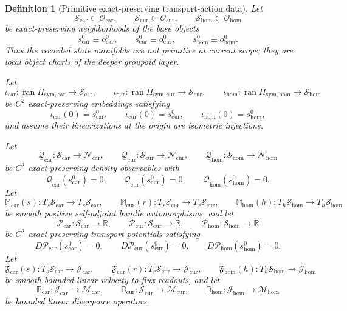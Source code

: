 \documentclass[11pt]{article}
\newcommand{\TensorSymProj}{\Pi_{\mathrm{sym,car}}}
\newcommand{\CurSymProj}{\Pi_{\mathrm{sym,cur}}}
\newcommand{\HomSymProj}{\Pi_{\mathrm{sym,hom}}}
\newcommand{\TensorDensityClass}{\mathscr N_{\mathrm{car}}}
\newcommand{\CurDensityClass}{\mathscr N_{\mathrm{cur}}}
\newcommand{\HomDensityClass}{\mathscr N_{\mathrm{hom}}}
\newcommand{\TensorStateManifold}{\mathcal S_{\mathrm{car}}}
\newcommand{\CurStateManifold}{\mathcal S_{\mathrm{cur}}}
\newcommand{\HomStateManifold}{\mathcal S_{\mathrm{hom}}}
\newcommand{\TensorStateBase}{s_{\mathrm{car}}^{0}}
\newcommand{\CurStateBase}{s_{\mathrm{cur}}^{0}}
\newcommand{\HomStateBase}{s_{\mathrm{hom}}^{0}}
\newcommand{\TensorStateEmbed}{\iota_{\mathrm{car}}}
\newcommand{\CurStateEmbed}{\iota_{\mathrm{cur}}}
\newcommand{\HomStateEmbed}{\iota_{\mathrm{hom}}}
\newcommand{\TensorFluxClass}{\mathscr J_{\mathrm{car}}}
\newcommand{\CurFluxClass}{\mathscr J_{\mathrm{cur}}}
\newcommand{\HomFluxClass}{\mathscr J_{\mathrm{hom}}}
\newcommand{\TensorDiv}{\mathbb B_{\mathrm{car}}}
\newcommand{\CurDiv}{\mathbb B_{\mathrm{cur}}}
\newcommand{\HomDiv}{\mathbb B_{\mathrm{hom}}}
\newcommand{\TensorObjClass}{\mathcal O_{\mathrm{car}}}
\newcommand{\CurObjClass}{\mathcal O_{\mathrm{cur}}}
\newcommand{\HomObjClass}{\mathcal O_{\mathrm{hom}}}
\newcommand{\TensorObjBase}{o_{\mathrm{car}}^0}
\newcommand{\CurObjBase}{o_{\mathrm{cur}}^0}
\newcommand{\HomObjBase}{o_{\mathrm{hom}}^0}
\newcommand{\TensorObjDensity}{\underline{\mathcal Q}_{\mathrm{car}}}
\newcommand{\CurObjDensity}{\underline{\mathcal Q}_{\mathrm{cur}}}
\newcommand{\HomObjDensity}{\underline{\mathcal Q}_{\mathrm{hom}}}
\newcommand{\TensorMobility}{\mathbb M_{\mathrm{car}}}
\newcommand{\CurMobility}{\mathbb M_{\mathrm{cur}}}
\newcommand{\HomMobility}{\mathbb M_{\mathrm{hom}}}
\newcommand{\TensorDrive}{\mathcal P_{\mathrm{car}}}
\newcommand{\CurDrive}{\mathcal P_{\mathrm{cur}}}
\newcommand{\HomDrive}{\mathcal P_{\mathrm{hom}}}
\newcommand{\TensorFluxRead}{\mathfrak F_{\mathrm{car}}}
\newcommand{\CurFluxRead}{\mathfrak F_{\mathrm{cur}}}
\newcommand{\HomFluxRead}{\mathfrak F_{\mathrm{hom}}}
\newtheorem{definition}{Definition}
\begin{document}
\begin{definition}[Primitive exact-preserving transport-action data]
\label{def:primitive_transport_action}
Let
\[
\TensorStateManifold\subset\TensorObjClass,\qquad
\CurStateManifold\subset\CurObjClass,\qquad
\HomStateManifold\subset\HomObjClass
\]
be exact-preserving neighborhoods of the base objects
\[
\TensorStateBase\equiv\TensorObjBase,\qquad
\CurStateBase\equiv\CurObjBase,\qquad
\HomStateBase\equiv\HomObjBase.
\]
Thus the recorded state manifolds are not primitive at current scope; they are local object charts of the deeper groupoid layer.

Let
\[
\TensorStateEmbed:\operatorname{ran}\TensorSymProj\to\TensorStateManifold,\qquad
\CurStateEmbed:\operatorname{ran}\CurSymProj\to\CurStateManifold,\qquad
\HomStateEmbed:\operatorname{ran}\HomSymProj\to\HomStateManifold
\]
be \(C^2\) exact-preserving embeddings satisfying
\begin{equation}
\TensorStateEmbed(0)=\TensorStateBase,\qquad
\CurStateEmbed(0)=\CurStateBase,\qquad
\HomStateEmbed(0)=\HomStateBase,
\label{eq:transport_embed_zero}
\end{equation}
and assume their linearizations at the origin are isometric injections.

Let
\[
\TensorObjDensity:\TensorStateManifold\to\TensorDensityClass,\qquad
\CurObjDensity:\CurStateManifold\to\CurDensityClass,\qquad
\HomObjDensity:\HomStateManifold\to\HomDensityClass
\]
be \(C^2\) exact-preserving density observables with
\begin{equation}
\TensorObjDensity(\TensorStateBase)=0,\qquad
\CurObjDensity(\CurStateBase)=0,\qquad
\HomObjDensity(\HomStateBase)=0.
\label{eq:object_density_zero}
\end{equation}
Let
\[
\TensorMobility(s):T_s\TensorStateManifold\to T_s\TensorStateManifold,\qquad
\CurMobility(r):T_r\CurStateManifold\to T_r\CurStateManifold,\qquad
\HomMobility(h):T_h\HomStateManifold\to T_h\HomStateManifold
\]
be smooth positive self-adjoint bundle automorphisms, and let
\[
\TensorDrive:\TensorStateManifold\to\mathbb R,\qquad
\CurDrive:\CurStateManifold\to\mathbb R,\qquad
\HomDrive:\HomStateManifold\to\mathbb R
\]
be \(C^2\) exact-preserving transport potentials satisfying
\begin{equation}
D\TensorDrive(\TensorStateBase)=0,\qquad
D\CurDrive(\CurStateBase)=0,\qquad
D\HomDrive(\HomStateBase)=0.
\label{eq:drive_zero}
\end{equation}
Let
\[
\TensorFluxRead(s):T_s\TensorStateManifold\to\TensorFluxClass,\qquad
\CurFluxRead(r):T_r\CurStateManifold\to\CurFluxClass,\qquad
\HomFluxRead(h):T_h\HomStateManifold\to\HomFluxClass
\]
be smooth bounded linear velocity-to-flux readouts, and let
\[
\TensorDiv:\TensorFluxClass\to\mathscr M_{\mathrm{car}},\qquad
\CurDiv:\CurFluxClass\to\mathscr M_{\mathrm{cur}},\qquad
\HomDiv:\HomFluxClass\to\mathscr M_{\mathrm{hom}}
\]
be bounded linear divergence operators.


\end{definition}
\end{document}
